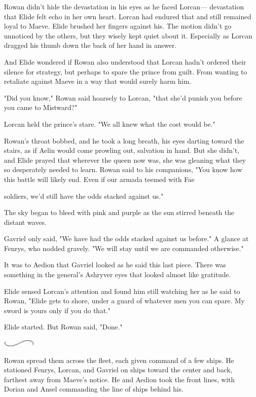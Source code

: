 Rowan didn't hide the devastation in his eyes as he faced Lorcan--- devastation that Elide felt echo in her own heart. Lorcan had endured that  and still remained loyal to Maeve. Elide brushed her fingers against his. The motion didn't go unnoticed by the others, but they wisely kept quiet about it. Especially as Lorcan dragged his thumb down the back of her hand in answer.

And Elide wondered if Rowan also understood that Lorcan hadn't ordered their silence for strategy, but perhaps to spare the prince from guilt. From wanting to retaliate against Maeve in a way that would surely harm him.

"Did you know," Rowan said hoarsely to Lorcan, "that she'd punish you before you came to Mistward?"

Lorcan held the prince's stare. "We all knew what the cost would be."

Rowan's throat bobbed, and he took a long breath, his eyes darting toward the stairs, as if Aelin would come prowling out, salvation in hand. But she didn't, and Elide prayed that wherever the queen now was, she was gleaning what they so desperately needed to learn. Rowan said to his companions, "You know how this battle will likely end. Even if our armada teemed with Fae

soldiers, we'd still have the odds stacked against us."

The sky began to bleed with pink and purple as the sun stirred beneath the distant waves.

Gavriel only said, "We have had the odds stacked against us before." A glance at Fenrys, who nodded gravely. "We will stay until we are commanded otherwise."

It was to Aedion that Gavriel looked as he said this last piece. There was something in the general's Ashryver eyes that looked almost like gratitude.

Elide sensed Lorcan's attention and found him still watching her as he said to Rowan, "Elide gets to shore, under a guard of whatever men you can spare. My sword is yours only if you do that."

Elide started. But Rowan said, "Done."

\includegraphics[width=0.65in,height=0.13in]{images/seperator}

Rowan spread them across the fleet, each given command of a few ships. He stationed Fenrys, Lorcan, and Gavriel on ships toward the center and back, farthest away from Maeve's notice. He and Aedion took the front lines, with Dorian and Ansel commanding the line of ships behind his.

